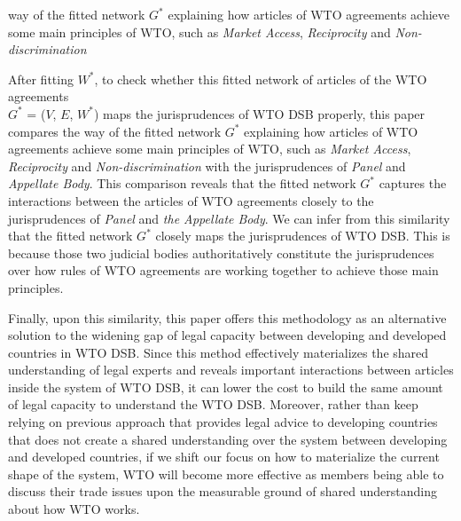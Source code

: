 way of the fitted network $G^*$ explaining how articles of WTO agreements achieve some main principles of WTO, such as \textit{Market Access}, \textit{Reciprocity} and \textit{Non-discrimination}



 
After fitting $W^*$, to check whether this fitted network of articles of the WTO agreements\\  $G^*$ = ($V$, $E$, $W^*$) maps the jurisprudences of WTO DSB properly, this paper
compares the way of the fitted network $G^*$ explaining how articles of WTO agreements achieve some main principles of WTO, such as \textit{Market Access}, \textit{Reciprocity} and \textit{Non-discrimination}
with the jurisprudences of \textit{Panel} and \textit{Appellate Body}. This comparison reveals that the fitted network $G^*$ captures the interactions between the articles of WTO agreements
closely to the jurisprudences of \textit{Panel} and \textit{the Appellate Body}. We can infer from this similarity that the fitted network $G^*$ closely maps the jurisprudences of WTO DSB. This is because those two judicial bodies
authoritatively constitute the jurisprudences over how rules of WTO agreements are working together
to achieve those main principles.
 
Finally, upon this similarity, this paper offers this methodology as
an alternative solution to the widening gap of legal capacity between developing and developed countries in WTO DSB.
Since this method effectively materializes the shared understanding of legal experts and reveals important interactions between articles inside the system of WTO DSB,
it can lower the cost to build the same amount of legal capacity to understand the WTO DSB.
Moreover, rather than keep relying on previous approach that provides legal advice to developing countries that does not create a shared understanding over the system between developing and developed countries,
if we shift our focus on how to materialize the current shape of the system, WTO
will become more effective as members being able to discuss their trade issues upon the measurable ground of shared understanding about how WTO works.
 



